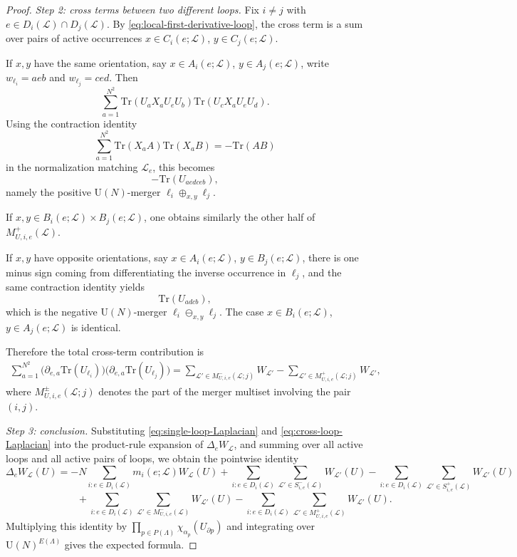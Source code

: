 \documentclass[11pt,a4paper,reqno]{article}
\theoremstyle{definition}
\theoremstyle{remark}
\newcommand\U{{\mathrm U}}
\newcommand\Tr{\mathrm{Tr}}
\newcommand\Lc{{\mathcal{L}}}
\begin{document}
\begin{proof}
\smallskip

\emph{Step 2: cross terms between two different loops.}
Fix $i\neq j$ with $e\in D_i(\Lc)\cap D_j(\Lc)$. By \eqref{eq:local-first-derivative-loop}, the cross term is a sum over pairs of active occurrences $x\in C_i(e;\Lc)$, $y\in C_j(e;\Lc)$.

If $x,y$ have the same orientation, say $x\in A_i(e;\Lc)$, $y\in A_j(e;\Lc)$, write $w_{\ell_i}=aeb$ and $w_{\ell_j}=ced$. Then
\[
\sum_{a=1}^{N^2}\Tr(U_aX_aU_eU_b)\Tr(U_cX_aU_eU_d).
\]
Using the contraction identity
\[
\sum_{a=1}^{N^2}\Tr(X_aA)\Tr(X_aB)=-\Tr(AB)
\]
in the normalization matching $\Lc_e$, this becomes
\[
-\Tr(U_{aedceb}),
\]
namely the positive $\U(N)$-merger $\ell_i\oplus_{x,y}\ell_j$.

If $x,y\in B_i(e;\Lc)\times B_j(e;\Lc)$, one obtains similarly the other half of $M^+_{U,i,e}(\Lc)$.

If $x,y$ have opposite orientations, say $x\in A_i(e;\Lc)$, $y\in B_j(e;\Lc)$, there is one minus sign coming from differentiating the inverse occurrence in $\ell_j$, and the same contraction identity yields
\[
\Tr(U_{adcb}),
\]
which is the negative $\U(N)$-merger $\ell_i\ominus_{x,y}\ell_j$. The case $x\in B_i(e;\Lc)$, $y\in A_j(e;\Lc)$ is identical.

Therefore the total cross-term contribution is
\begin{align}
\sum_{a=1}^{N^2}
\bigl(\partial_{e,a}\Tr(U_{\ell_i})\bigr)\bigl(\partial_{e,a}\Tr(U_{\ell_j})\bigr)=\sum_{\Lc'\in M^-_{U,i,e}(\Lc;j)} W_{\Lc'}-\sum_{\Lc'\in M^+_{U,i,e}(\Lc;j)} W_{\Lc'},
\label{eq:cross-loop-Laplacian}
\end{align}
where $M^\pm_{U,i,e}(\Lc;j)$ denotes the part of the merger multiset involving the pair
$(i,j)$.

\smallskip

\emph{Step 3: conclusion.}
Substituting \eqref{eq:single-loop-Laplacian} and \eqref{eq:cross-loop-Laplacian} into the product-rule expansion of $\Delta_eW_{\Lc}$, and summing over all active loops and all active pairs of loops, we obtain the pointwise identity
\[
\Delta_eW_{\Lc}(U)=-N\sum_{i:e\in D_i(\Lc)} m_i(e;\Lc)W_{\Lc}(U)+\sum_{i:e\in D_i(\Lc)}\sum_{\Lc'\in S^-_{i,e}(\Lc)} W_{\Lc'}(U)-\sum_{i:e\in D_i(\Lc)}\sum_{\Lc'\in S^+_{i,e}(\Lc)} W_{\Lc'}(U)
\]
\[
\hspace{3cm}
+\sum_{i:e\in D_i(\Lc)}\sum_{\Lc'\in M^-_{U,i,e}(\Lc)} W_{\Lc'}(U)-\sum_{i:e\in D_i(\Lc)}\sum_{\Lc'\in M^+_{U,i,e}(\Lc)} W_{\Lc'}(U).
\]
Multiplying this identity by $\prod_{p\in P(\Lambda)}\chi_{\alpha_p}(U_{\partial p})$ and
integrating over $\U(N)^{E(\Lambda)}$ gives the expected formula.
\end{proof}
\end{document}
